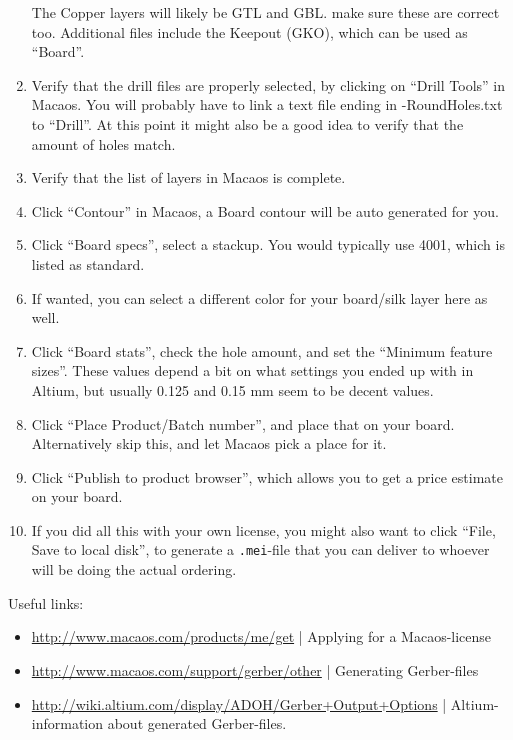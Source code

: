 \begin{enumerate}
  The Copper layers will likely be GTL and GBL. make sure these are correct
  too. Additional files include the Keepout (GKO), which can be used as
  ``Board''.
\item Verify that the drill files are properly selected, by clicking on ``Drill
  Tools'' in Macaos. You will probably have to link a text file ending in
  -RoundHoles.txt to ``Drill''. At this point it might also be a good idea to
  verify that the amount of holes match.
\item Verify that the list of layers in Macaos is complete.
\item Click ``Contour'' in Macaos, a Board contour will be auto generated for
  you.
\item Click ``Board specs'', select a stackup. You would typically use 4001,
  which is listed as standard.
\item If wanted, you can select a different color for your board/silk layer
  here as well.
\item Click ``Board stats'', check the hole amount, and set the ``Minimum
  feature sizes''. These values depend a bit on what settings you ended up with
  in Altium, but usually 0.125 and 0.15 mm seem to be decent values.
\item Click ``Place Product/Batch number'', and place that on your board.
  Alternatively skip this, and let Macaos pick a place for it.
\item Click ``Publish to product browser'', which allows you to get a price
  estimate on your board.
\item If you did all this with your own license, you might also want to click
  ``File, Save to local disk'', to generate a {\tt .mei}-file that you can
  deliver to whoever will be doing the actual ordering.
\end{enumerate}

Useful links:
\begin{itemize}
\item \url{http://www.macaos.com/products/me/get} | Applying for a
  Macaos-license
\item \url{http://www.macaos.com/support/gerber/other} | Generating Gerber-files
\item \url{http://wiki.altium.com/display/ADOH/Gerber+Output+Options} |
  Altium-information about generated Gerber-files.
\end{itemize}
